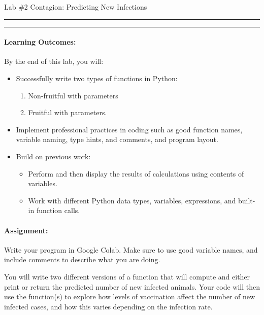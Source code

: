 \documentclass[10pt]{article}
\begin{document}
  \thispagestyle{empty}
  \def\cpp{C{\tt ++}\xspace}

  \begin{bf}
      Lab \#2
      \hfill 
      Contagion: Predicting New Infections
      \hfill
  \end{bf}

  \vspace*{10pt} \hrule \vspace*{1pt} \hrule

  \vspace*{-10pt}
  
  \paragraph{Learning Outcomes:} By the end of this lab, you will:
  \vspace*{-15pt}
\begin{itemize}
\setlength\itemsep{-0.5em}
    \item Successfully write two types of functions in Python:
    \begin{enumerate}
    \item    Non-fruitful with parameters
    \item    Fruitful with parameters.
    \end{enumerate}
    \item Implement professional practices in coding such as 
        good function names, variable naming, type hints, and comments, and program layout.
    \item Build on previous work: 
        \begin{itemize}
            \item Perform and then display the results of calculations using
                contents of variables.
            \item Work with different Python data types, variables, expressions,
                and built-in function calls.
        \end{itemize}
\end{itemize}
  \vspace*{-15pt}
  \paragraph{Assignment:}

  Write your program in Google Colab.
  Make sure to use good variable names, and include comments to describe
  what you are doing.

  You will write two different versions of a function that will compute and
  either print or return the predicted number of new infected animals.
  Your code will then use the function(s) to explore how levels of vaccination affect the number of new infected cases, and how this varies depending on the infection rate. 
\end{document}
